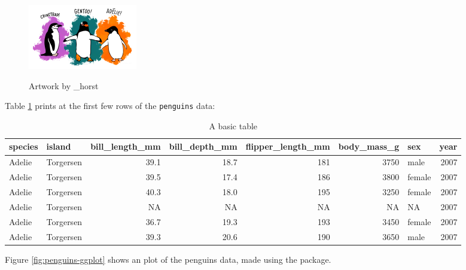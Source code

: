 \begin{figure}
\includegraphics[width=1\linewidth,height=0.3\textheight,alt={A picture of three different penguins with their species: Chinstrap, Gentoo, and Adelie. }]{figures/penguins} \caption{Artwork by \@allison\_horst}\label{fig:penguins-alison}
\end{figure}

Table \ref{tab:penguins-tab-static} prints at the first few rows of the \texttt{penguins} data:

\begin{table}
\centering
\caption{\label{tab:penguins-tab-static}A basic table}
\centering
\fontsize{7}{9}\selectfont
\begin{tabular}[t]{l|l|r|r|r|r|l|r}
\hline
species & island & bill\_length\_mm & bill\_depth\_mm & flipper\_length\_mm & body\_mass\_g & sex & year\\
\hline
Adelie & Torgersen & 39.1 & 18.7 & 181 & 3750 & male & 2007\\
\hline
Adelie & Torgersen & 39.5 & 17.4 & 186 & 3800 & female & 2007\\
\hline
Adelie & Torgersen & 40.3 & 18.0 & 195 & 3250 & female & 2007\\
\hline
Adelie & Torgersen & NA & NA & NA & NA & NA & 2007\\
\hline
Adelie & Torgersen & 36.7 & 19.3 & 193 & 3450 & female & 2007\\
\hline
Adelie & Torgersen & 39.3 & 20.6 & 190 & 3650 & male & 2007\\
\hline
\end{tabular}
\end{table}

Figure \ref{fig:penguins-ggplot} shows an plot of the penguins data, made using the  package.


